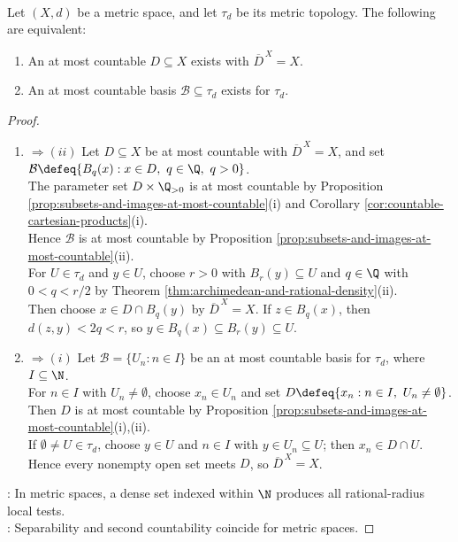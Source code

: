 \begin{proposition} \label{prop:metric-separable-countable-base} \\
Let $(X,d)$ be a metric space, and let $\tau_d$ be its metric topology. The following are equivalent:
\begin{enumerate}[label=(\roman*)]
\setlength{\itemsep}{0pt}
\item An at most countable $D\subseteq X$ exists with $\overline{D}^{\,X}=X$.
\item An at most countable basis $\mathcal{B}\subseteq\tau_d$ exists for $\tau_d$.
\end{enumerate}
\begin{proof}
\begin{enumerate}[label=(\roman*)]
\setlength{\itemsep}{0pt}
\item[$(i)$]$\Rightarrow (ii)$ Let $D\subseteq X$ be at most countable with $\overline{D}^{\,X}=X$, and set $\mathcal{B}\defeq\{B_q(x):x\in D,\ q\in\Q,\ q>0\}$.\\
The parameter set $D\times\Q_{>0}$ is at most countable by Proposition \ref{prop:subsets-and-images-at-most-countable}(i) and Corollary \ref{cor:countable-cartesian-products}(i).\\
Hence $\mathcal{B}$ is at most countable by Proposition \ref{prop:subsets-and-images-at-most-countable}(ii).\\
For $U\in\tau_d$ and $y\in U$, choose $r>0$ with $B_r(y)\subseteq U$ and $q\in\Q$ with $0<q<r/2$ by Theorem \ref{thm:archimedean-and-rational-density}(ii).\\
Then choose $x\in D\cap B_q(y)$ by $\overline{D}^{\,X}=X$. If $z\in B_q(x)$, then $d(z,y)<2q<r$, so $y\in B_q(x)\subseteq B_r(y)\subseteq U$.
\item[$(ii)$]$\Rightarrow (i)$ Let $\mathcal{B}=\{U_n:n\in I\}$ be an at most countable basis for $\tau_d$, where $I\subseteq\N$.\\
For $n\in I$ with $U_n\neq\emptyset$, choose $x_n\in U_n$ and set $D\defeq\{x_n:n\in I,\ U_n\neq\emptyset\}$.\\
Then $D$ is at most countable by Proposition \ref{prop:subsets-and-images-at-most-countable}(i),(ii).\\
If $\emptyset\neq U\in\tau_d$, choose $y\in U$ and $n\in I$ with $y\in U_n\subseteq U$; then $x_n\in D\cap U$.\\
Hence every nonempty open set meets $D$, so $\overline{D}^{\,X}=X$.
\end{enumerate}
: In metric spaces, a dense set indexed within $\N$ produces all rational-radius local tests.\\
: Separability and second countability coincide for metric spaces.
\end{proof}
\end{proposition}

